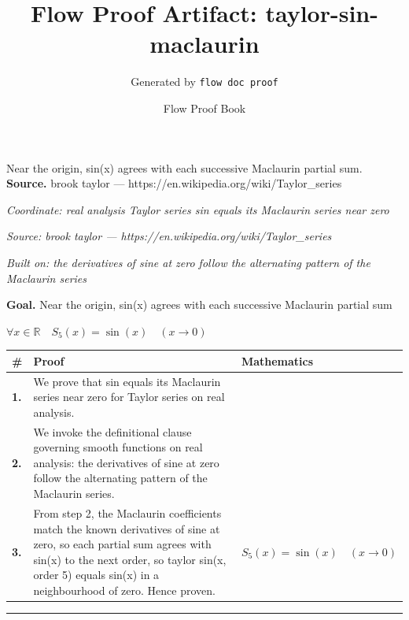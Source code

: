 \documentclass[11pt]{article}
\title{Flow Proof Artifact: taylor-sin-maclaurin}
\author{Generated by \texttt{flow doc proof}}
\date{Flow Proof Book}
\theoremstyle{definition}
\begin{document}
\maketitle
Near the origin, sin(x) agrees with each successive Maclaurin partial sum.\\[0.5em]
\textbf{Source.} brook taylor — https://en.wikipedia.org/wiki/Taylor\_series\\[0.5em]
\bigskip
{}\par
\smallskip\noindent\textit{Coordinate: real analysis \cdot Taylor series \cdot sin equals its Maclaurin series near zero}\par
\smallskip\noindent\textit{Source: brook taylor — https://en.wikipedia.org/wiki/Taylor\_series}\par
\smallskip\noindent\textit{Built on: the derivatives of sine at zero follow the alternating pattern of the Maclaurin series}\par
\medskip
\noindent\textbf{Goal.} Near the origin, sin(x) agrees with each successive Maclaurin partial sum\par
\noindent$\displaystyle \forall x \in \mathbb{R}\quad S_{5}(x) = \sin(x) \quad (x \to 0)$\par
\medskip
\noindent
\begin{tabular}{@{} >{\raggedright\arraybackslash}p{} >{\raggedright\arraybackslash}p{} >{\raggedleft\arraybackslash}p{} @{}}
\textbf{\#} & \textbf{Proof} & \textbf{Mathematics} \\
\midrule
\textbf{1.} & We prove that sin equals its Maclaurin series near zero for Taylor series on real analysis. & \\[0.45em]
\textbf{2.} & We invoke the definitional clause governing smooth functions on real analysis: the derivatives of sine at zero follow the alternating pattern of the Maclaurin series. & \\[0.45em]
\textbf{3.} & From step 2, the Maclaurin coefficients match the known derivatives of sine at zero, so each partial sum agrees with sin(x) to the next order, so taylor sin(x, order 5) equals sin(x) in a neighbourhood of zero. Hence proven. & $\displaystyle S_{5}(x) = \sin(x) \quad (x \to 0)$ \\[0.45em]
\bottomrule
\end{tabular}
\label{thm:Analysis-Taylor series-sin_equals_its_maclaurin_series_near_zero}
\par\medskip\hrule
\end{document}
